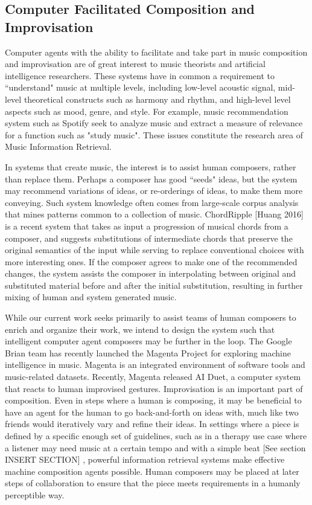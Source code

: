\documentclass[final,authoryear,11pt,times]{elsarticle}
\begin{document}
\subsection{Computer Facilitated Composition and Improvisation}

Computer agents with the ability to facilitate and take part in music composition and improvisation are of great interest to music theorists and artificial intelligence researchers. These systems have in common a requirement to ``understand" music at multiple levels, including low-level acoustic signal, mid-level theoretical constructs such as harmony and rhythm, and high-level level aspects such as mood, genre, and style. For example, music recommendation system such as Spotify seek to analyze music and extract a measure of relevance for a function such as "study music". These issues constitute the research area of Music Information Retrieval.

In systems that create music, the interest is to assist human composers, rather than replace them. Perhaps a composer has good ``seeds" ideas, but the system may recommend variations of ideas, or re-orderings of ideas, to make them more conveying. Such system knowledge often comes from large-scale corpus analysis that mines patterns common to a collection of music. ChordRipple [Huang 2016] is a recent system that takes as input a progression of musical chords from a composer, and suggests substitutions of intermediate chords that preserve the original semantics of the input while serving to replace conventional choices with more interesting ones. If the composer agrees to make one of the recommended changes, the system assists the composer in interpolating between original and substituted material before and after the initial substitution, resulting in further mixing of human and system generated music.

While our current work seeks primarily to assist teams of human composers to enrich and organize their work, we intend to design the system such that intelligent computer agent composers may be further in the loop. The Google Brian team has recently launched the Magenta Project for exploring machine intelligence in music. Magenta is an integrated environment of software tools and music-related datasets. Recently, Magenta released AI Duet, a computer system that reacts to human improvised gestures. Improvisation is an important part of composition. Even in steps where a human is composing, it may be beneficial to have an agent for the human to go back-and-forth on ideas with, much like two friends would iteratively vary and refine their ideas. In settings where a piece is defined by a specific enough set of guidelines, such as in a therapy use case where a listener may need music at a certain tempo and with a simple beat [See section INSERT SECTION] , powerful information retrieval systems make effective machine composition agents possible. Human composers may be placed at later steps of collaboration to ensure that the piece meets requirements in a humanly perceptible way.
\end{document}
